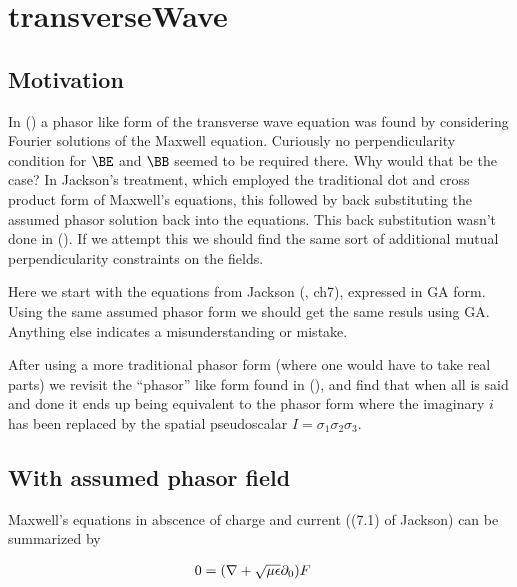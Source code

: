 

\chapter{transverseWave}
\label{chap:transverseWave}
{}
\date{August 6, 2009}

\beginArtWithToc

\section{Motivation}

In (\cite{maxwellVacuum}) a phasor like form of the transverse wave equation was found by considering Fourier solutions of the Maxwell equation.  Curiously no perpendicularity condition for $\BE$ and $\BB$ seemed to be required there.  Why would that be the case?  In Jackson's treatment, which employed the traditional dot and cross product form of Maxwell's equations, this followed by back substituting the assumed phasor solution back into the equations.  This back substitution wasn't done in (\cite{maxwellVacuum}).  If we attempt this we should find the same sort of additional mutual perpendicularity constraints on the fields.

Here we start with the equations from Jackson (\cite{jackson1975cew}, ch7), expressed in GA form.  Using the same assumed phasor form we should get the same resuls using GA.  Anything else indicates a misunderstanding or mistake.

After using a more traditional phasor form (where one would have to take real parts) we revisit the ``phasor'' like form found in (\cite{maxwellVacuum}), and find that when all is said and done it ends up being equivalent to the phasor form where the imaginary $i$ has been replaced by the spatial pseudoscalar $I = \sigma_1\sigma_2\sigma_3$.

\section{With assumed phasor field}

Maxwell's equations in abscence of charge and current ((7.1) of Jackson) can be summarized by 

\begin{align}\label{eqn:foo1}
0 &= (\nabla + \sqrt{\mu\epsilon}\partial_0) F 
\end{align}

